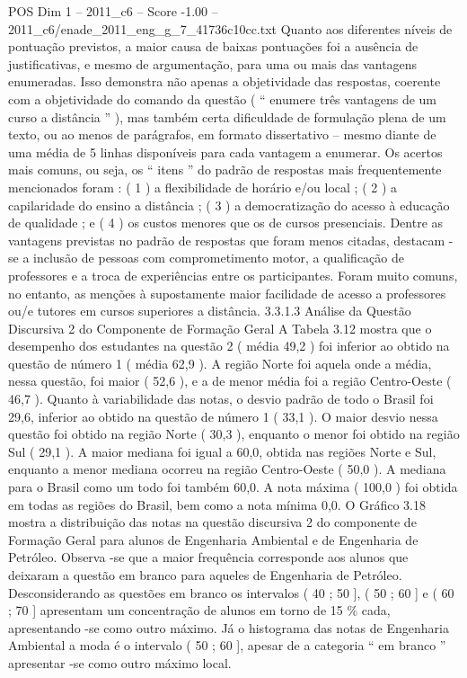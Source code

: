 \begin{textsample}{POS Dim 1 – 2011\_c6 – Score -1.00 – 2011\_c6/enade\_2011\_eng\_g\_7\_41736c10cc.txt}
Quanto aos diferentes níveis de pontuação previstos, a maior causa de baixas pontuações foi a ausência de justificativas, e mesmo de argumentação, para uma ou mais das vantagens enumeradas.
Isso demonstra não apenas a objetividade das respostas, coerente com a objetividade do comando da questão ( “ enumere três vantagens de um curso a distância ” ), mas também certa dificuldade de formulação plena de um texto, ou ao menos de parágrafos, em formato dissertativo – mesmo diante de uma média de 5 linhas disponíveis para cada vantagem a enumerar.
Os acertos mais comuns, ou seja, os “ itens ” do padrão de respostas mais frequentemente mencionados foram : ( 1 ) a flexibilidade de horário e/ou local ; ( 2 ) a capilaridade do ensino a distância ; ( 3 ) a democratização do acesso à educação de qualidade ; e ( 4 ) os custos menores que os de cursos presenciais.
Dentre as vantagens previstas no padrão de respostas que foram menos citadas, destacam -se a inclusão de pessoas com comprometimento motor, a qualificação de professores e a troca de experiências entre os participantes.
Foram muito comuns, no entanto, as menções à supostamente maior facilidade de acesso a professores ou/e tutores em cursos superiores a distância. 3.3.1.3 Análise da Questão Discursiva 2 do Componente de Formação Geral A Tabela 3.12 mostra que o desempenho dos estudantes na questão 2 ( média 49,2 ) foi inferior ao obtido na questão de número 1 ( média 62,9 ).
A região Norte foi aquela onde a média, nessa questão, foi maior ( 52,6 ), e a de menor média foi a região Centro-Oeste ( 46,7 ).
Quanto à variabilidade das notas, o desvio padrão de todo o Brasil foi 29,6, inferior ao obtido na questão de número 1 ( 33,1 ).
O maior desvio nessa questão foi obtido na região Norte ( 30,3 ), enquanto o menor foi obtido na região Sul ( 29,1 ).
A maior mediana foi igual a 60,0, obtida nas regiões Norte e Sul, enquanto a menor mediana ocorreu na região Centro-Oeste ( 50,0 ).
A mediana para o Brasil como um todo foi também 60,0.
A nota máxima ( 100,0 ) foi obtida em todas as regiões do Brasil, bem como a nota mínima 0,0.
O Gráfico 3.18 mostra a distribuição das notas na questão discursiva 2 do componente de Formação Geral para alunos de Engenharia Ambiental e de Engenharia de Petróleo.
Observa -se que a maior frequência corresponde aos alunos que deixaram a questão em branco para aqueles de Engenharia de Petróleo.
Desconsiderando as questões em branco os intervalos ( 40 ; 50 ], ( 50 ; 60 ] e ( 60 ; 70 ] apresentam um concentração de alunos em torno de 15 \% cada, apresentando -se como outro máximo.
Já o histograma das notas de Engenharia Ambiental a moda é o intervalo ( 50 ; 60 ], apesar de a categoria “ em branco ” apresentar -se como outro máximo local.

\end{textsample}
